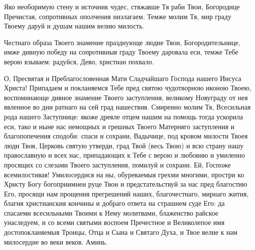 \mychapterending

\begin{mymulticols}


Яко необоримую стену и источник чудес, стяжавше Тя раби Твои, Богородице Пречистая, сопротивных ополчения низлагаем. Темже молим Тя, мир граду Твоему даруй и душам нашим велию милость.


Честнаго образа Твоего знамение празднующе людие Твои, Богородительнице, имже дивную победу на сопротивныя граду Твоему даровала еси, темже Тебе верою взываем: радуйся, Дево, христиан похвало.


О, Пресвятая и Преблагословенная Мати Сладчайшаго Господа нашего Иисуса Христа! Припадаем и покланяемся Тебе пред святою чудотворною иконою Твоею, воспоминающе дивное знамение Твоего заступления, великому Новуграду от нея явленное во дни ратнаго на сей град нашествия. Смиренно молим Тя, Всесильная рода нашего Заступнице: якоже древле отцем нашим на помощь тогда ускорила еси, тако и ныне нас немощных и грешных Твоего Матерняго заступления и благопопечения сподоби: спаси и сохрани, Вадычице, под кровом милости Твоея люди Твоя, Церковь святую утверди, град Твой (весь Твою) и всю страну нашу православную и всех нас, припадающих к Тебе с верою и любовию и умиленно просящих со слезами Твоего заступления, помилуй и сохрани. Ей, Госпоже всемилостивая! Умилосердися на ны, обуреваемыя грехми многими, простри ко Христу Богу богоприимнеи руце Твои и предстательствуй за нас пред благостию Его, просящи нам прощения прегрешений наших, благочестнаго, мирнаго жития, благия христианския кончины и добраго ответа на страшнем суде Его: да спасаеми всесильными Твоими к Нему молитвами, блаженство райское унаследуем, и со всеми святыми воспоем Пречестное и Великолепое имя достопокланяемыя Троицы, Отца и Сына и Святаго Духа, и Твое велие к нам милосердие во веки веков. Аминь.

\end{mymulticols}

\mychapterending

